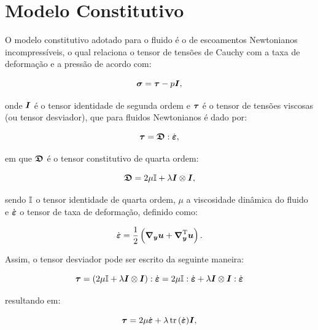 \section{Modelo Constitutivo} \label{MC}

O modelo constitutivo adotado para o fluido é o de escoamentos Newtonianos incompressíveis, o qual relaciona o tensor de tensões de Cauchy com a taxa de deformação e a pressão de acordo com:

\begin{equation}
    \boldsymbol{\sigma}=\boldsymbol{\tau}-p\boldsymbol{I}\text{,}\label{eq:const1}
\end{equation}

\noindent onde $\boldsymbol{I}$ é o tensor identidade de segunda ordem e $\boldsymbol{\tau}$ é o tensor de tensões viscosas (ou tensor desviador), que para fluidos Newtonianos é dado por:

\begin{equation}
    \boldsymbol{\tau}=\boldsymbol{\mathfrak{D}}:\dot{\boldsymbol{\varepsilon}}\text{,}
\end{equation}

\noindent em que $\boldsymbol{\mathfrak{D}}$ é o tensor constitutivo de quarta ordem:

\begin{equation}
    \boldsymbol{\mathfrak{D}}=2\mu\boldsymbol{\mathbb{I}}+\lambda\boldsymbol{I}\otimes\boldsymbol{I}\text{,}
\end{equation}

\noindent sendo $\boldsymbol{\mathbb{I}}$ o tensor identidade de quarta ordem, $\mu$ a viscosidade dinâmica do fluido e $\dot{\boldsymbol{\varepsilon}}$ o tensor de taxa de deformação, definido como:

\begin{equation}
    \dot{\boldsymbol{\varepsilon}}=\frac{1}{2}\left({\boldsymbol{\nabla_y}\boldsymbol{u}+\boldsymbol{\nabla}^{\mathrm{T}}_{\boldsymbol{y}}\boldsymbol{u}}\right)\text{.}\label{eq:deftax1}
\end{equation}

Assim, o tensor desviador pode ser escrito da seguinte maneira:

\[
    \boldsymbol{\tau}=(2\mu\boldsymbol{\mathbb{I}}+\lambda\boldsymbol{I}\otimes\boldsymbol{I}):\dot{\boldsymbol{\varepsilon}}=2\mu\boldsymbol{\mathbb{I}}:\dot{\boldsymbol{\varepsilon}}+\lambda\boldsymbol{I}\otimes\boldsymbol{I}:\dot{\boldsymbol{\varepsilon}}
\]

\noindent resultando em:

\begin{equation}
    \boldsymbol{\tau}=2\mu\dot{\boldsymbol{\varepsilon}}+\lambda\mathop{\mathrm{tr}}\nolimits{(\dot{\boldsymbol{\varepsilon}})}\boldsymbol{I}\text{,}
\end{equation}

